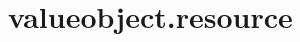 \section{valueobject.resource}
\label{configuration:ValueobjectResource}
\AvailableInJavaOnly{\TODO}